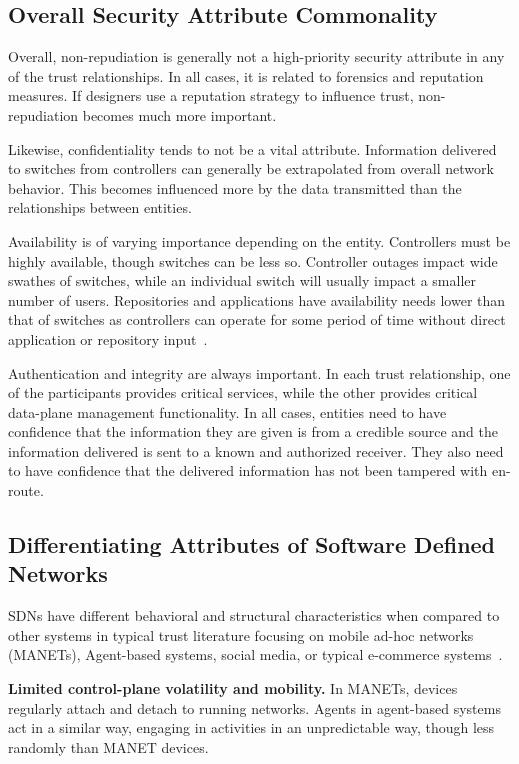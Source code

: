 \documentclass[10pt,conference]{IEEEtran}
\begin{document}
\subsection{Overall Security Attribute Commonality}
\label{sec:commonality}
Overall, non-repudiation is generally not a high-priority security attribute in any of the trust relationships.  In all cases, it is related to forensics and reputation measures.  If designers use a reputation strategy to influence trust, non-repudiation becomes much more important.

Likewise, confidentiality tends to not be a vital attribute.  Information delivered to switches from controllers can generally be extrapolated from overall network behavior.  This becomes influenced more by the data transmitted than the relationships between entities.

Availability is of varying importance depending on the entity.  Controllers must be highly available, though switches can be less so.  Controller outages impact wide swathes of switches, while an individual switch will usually impact a smaller number of users.  Repositories and applications have availability needs lower than that of switches as controllers can operate for some period of time without direct application or repository input~\cite{ScSu:13}.

Authentication and integrity are always important.  In each trust relationship, one of the participants provides critical services, while the other provides critical data-plane management functionality.  In all cases, entities need to have confidence that the information they are given is from a credible source and the information delivered is sent to a known and authorized receiver.  They also need to have confidence that the delivered information has not been tampered with en-route.

\subsection{Differentiating Attributes of Software Defined Networks}
\label{sec:attributes}
SDNs have different behavioral and structural characteristics when compared to other systems in typical trust literature focusing on mobile ad-hoc networks (MANETs), Agent-based systems, social media, or typical e-commerce systems~\cite{ChSwCh:11,JoIsBo:07,SaSi:05,ShNePa:13,GoMo:12}.

\noindent
{\bf Limited control-plane volatility and mobility.} In MANETs, devices regularly attach and detach to running networks. Agents in agent-based systems act in a similar way, engaging in activities in an unpredictable way, though less randomly than MANET devices.
\end{document}
